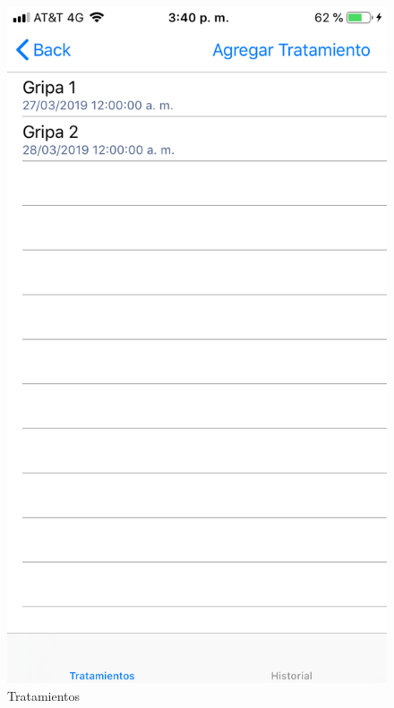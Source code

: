 \begin{enumerate}
	\begin{figure}[!htbp]			
		\hypertarget{fig:Tratamientos4}{\hspace{1pt}}
		\begin{center}
			\includegraphics[height=0.4\textheight]{Paciente/AgregarMedicamento/images/Tratamientos}
			\caption{Tratamientos}
			\label{fig:Tratamientos4}
		\end{center}
	\end{figure}


\end{enumerate}
